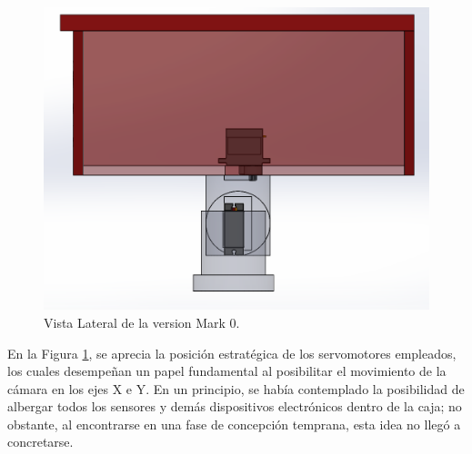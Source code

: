     \begin{figure}[H]
    \centering
    \begin{adjustbox}{width=\linewidth/2}
      \includegraphics{media/lateral_Mark00.png}
    \end{adjustbox}
    \caption{\label{fig:lateral_Mark00}Vista Lateral de la version Mark 0.}
    \end{figure}
    En la Figura \ref{fig:lateral_Mark00}, se aprecia la posición estratégica de los servomotores empleados, los cuales desempeñan un papel fundamental al posibilitar el movimiento de la cámara en los ejes X e Y. En un principio, se había contemplado la posibilidad de albergar todos los sensores y demás dispositivos electrónicos dentro de la caja; no obstante, al encontrarse en una fase de concepción temprana, esta idea no llegó a concretarse.

\needspace{3cm}
